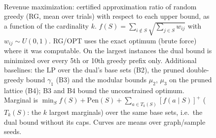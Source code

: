 \begin{figure}[t]
\centering
\setlength{\rgplotwidth}{0.245\textwidth}
\\[1pt]
\hfill
\hfill
\hfill

\caption{Revenue maximization: certified approximation ratio of random greedy (RG, mean over trials) with respect to each upper bound, as a function of the cardinality $k$. $f(S)=\sum_{i\notin S}\sqrt{\sum_{j\in S} w_{ij}}$ with $w_{ij}\sim U(0,1)$. RG/OPT uses the exact optimum (brute force) where it was computable. On the largest instances the dual bound is minimized over every 5th or 10th greedy prefix only. Additional baselines: the LP over the dual's base sets (B2), the pruned double-greedy bound $\gamma_1$ (B3) and the modular bounds $\mu_2$, $\mu_3$ on the pruned lattice (B4); B3 and B4 bound the unconstrained optimum. Marginal is $\min_S f(S)+\mathrm{Pen}(S)+\sum_{a\in T_k(S)}[f(a\mid S)]^+$ ($T_k(S)$: the $k$ largest marginals) over the same base sets, i.e.\ the dual bound without its caps. Curves are means over graph/sample seeds.}
\label{fig:rg-revenue_max-wide-baselines}
\end{figure}
